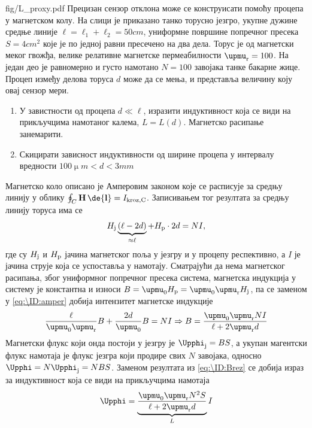 \begin{slikaDesno}{fig/L_proxy.pdf}
\PID 
Прецизан сензор отклона може се конструисати помоћу процепа у магнетском колу. На слици је приказано
танко торусно језгро, укупне дужине средње линије $\ell = \ell_1 + \ell_2 = 50\unit{cm}$, униформне површине 
попречног пресека $S = 4\unit{cm^2}$ које је по једној 
равни пресечено на два дела. Торус је од магнетски меког гвожђа, велике релативне магнетске пермеабилности 
$\upmu_{\rm r} = 100$. На један део је равномерно и густо намотано $N = 100$ завојака танке бакарне жице. 
Процеп између делова торуса $d$ може да се мења, и представља величину коју овај сензор мери. 
\end{slikaDesno}
 
\begin{enumerate}[label=(\alph*)]
\item У завистности од процепа $d \ll \ell$, изразити индуктивност која се види на прикључцима намотаног калема, $L = L(d)$. 
    Магнетско расипање занемарити.
\item Скицирати зависност индуктивности од ширине процепа у интервалу вредности $100\unit{\upmu m} < d < 3\unit{mm}$
\end{enumerate}

\RESENJE 

Магнетско коло описано је Амперовим законом које се расписује за средњу линију у облику 
$\oint_C {\bf H}\, \de{\bf l} = I_{\rm kroz, C}$. Записивањем тог резултата за средњу линију торуса има се 
\begin{equation}
H_{\rm j} \underbrace{(\ell - 2d)}_{\approx \ell} + H_{\rm p} \cdot 2 d = N I, \label{eq:\ID:amper}
\end{equation}
где су 
$H_{\rm j}$ и $H_{\rm p}$ јачина магнетског поља у језгру и у процепу респективно, а $I$ је јачина струје која 
се успоставља у намотају. Сматрајући да нема 
магнетског расипања, због униформног попречног пресека система, магнетска индукција у систему је константна 
и износи $B = \upmu_0 H_{\rm p} = \upmu_0 \upmu_{\rm r} H_{\rm j}$, па се заменом у \ref{eq:\ID:amper} добија интензитет магнетске 
индукције   
\begin{equation}
    \dfrac{\ell}{\upmu_0 \upmu_{\rm r} } B + \dfrac{2d}{\upmu_0} B = NI
    \Rightarrow
    B = \dfrac{\upmu_0 \upmu_{\rm r} NI}{{\ell} + {2\upmu_{\rm r} d}  }
    \label{eq:\ID:Brez}
\end{equation}
Магнетски флукс који онда постоји у језгру је $\Upphi_{\rm j} = BS$, а укупан магентски флукс намотаја је 
флукс језгра који продире свих $N$ завојака, односно $\Upphi = N\Upphi_{\rm j} = NBS$. Заменом резултата из 
\ref{eq:\ID:Brez} се добија израз за индуктивност која се види на прикључцима намотаја
\begin{equation}
    \Upphi = \underbrace{\dfrac{\upmu_0 \upmu_{\rm r} N^2 S}{{\ell} + {2\upmu_{\rm r} d}  }}_{L} I
\end{equation}


